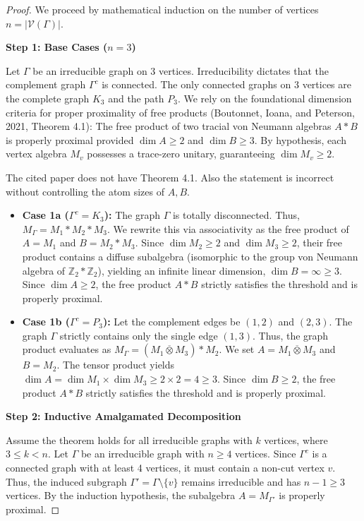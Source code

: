 \documentclass[12pt]{article}
\newcommand{\VV}{\mathcal{V}}
\newcommand{\review}[1]{\begin{reviewbox}#1\end{reviewbox}}
\begin{document}
\begin{proof}
We proceed by mathematical induction on the number of vertices $n = |\VV(\Gamma)|$. 

\medskip\noindent\textbf{Step 1: Base Cases ($n=3$)}

Let $\Gamma$ be an irreducible graph on 3 vertices. Irreducibility dictates that the complement graph $\Gamma^c$ is connected. The only connected graphs on 3 vertices are the complete graph $K_3$ and the path $P_3$. 
We rely on the foundational dimension criteria for proper proximality of free products (Boutonnet, Ioana, and Peterson, 2021, Theorem 4.1): The free product of two tracial von Neumann algebras $A \ast B$ is properly proximal provided $\dim A \ge 2$ and $\dim B \ge 3$. By hypothesis, each vertex algebra $M_v$ possesses a trace-zero unitary, guaranteeing $\dim M_v \ge 2$.

\review{The cited paper does not have Theorem 4.1. Also the statement is incorrect without controlling the atom sizes of $A,B$.}

\begin{itemize}
    \item \textbf{Case 1a ($\Gamma^c = K_3$):} The graph $\Gamma$ is totally disconnected. Thus, $M_\Gamma = M_1 \ast M_2 \ast M_3$. We rewrite this via associativity as the free product of $A = M_1$ and $B = M_2 \ast M_3$. Since $\dim M_2 \ge 2$ and $\dim M_3 \ge 2$, their free product contains a diffuse subalgebra (isomorphic to the group von Neumann algebra of $\mathbb{Z}_2 \ast \mathbb{Z}_2$), yielding an infinite linear dimension, $\dim B = \infty \ge 3$. Since $\dim A \ge 2$, the free product $A \ast B$ strictly satisfies the threshold and is properly proximal.
    
    \item \textbf{Case 1b ($\Gamma^c = P_3$):} Let the complement edges be $(1,2)$ and $(2,3)$. The graph $\Gamma$ strictly contains only the single edge $(1,3)$. Thus, the graph product evaluates as $M_\Gamma = (M_1 \overline{\otimes} M_3) \ast M_2$. We set $A = M_1 \overline{\otimes} M_3$ and $B = M_2$. The tensor product yields $\dim A = \dim M_1 \times \dim M_3 \ge 2 \times 2 = 4 \ge 3$. Since $\dim B \ge 2$, the free product $A \ast B$ strictly satisfies the threshold and is properly proximal.
\end{itemize}

\medskip\noindent\textbf{Step 2: Inductive Amalgamated Decomposition}

Assume the theorem holds for all irreducible graphs with $k$ vertices, where $3 \le k < n$. Let $\Gamma$ be an irreducible graph with $n \ge 4$ vertices. Since $\Gamma^c$ is a connected graph with at least 4 vertices, it must contain a non-cut vertex $v$. Thus, the induced subgraph $\Gamma' = \Gamma \setminus \{v\}$ remains irreducible and has $n-1 \ge 3$ vertices. By the induction hypothesis, the subalgebra $A = M_{\Gamma'}$ is properly proximal.


\end{proof}
\end{document}
